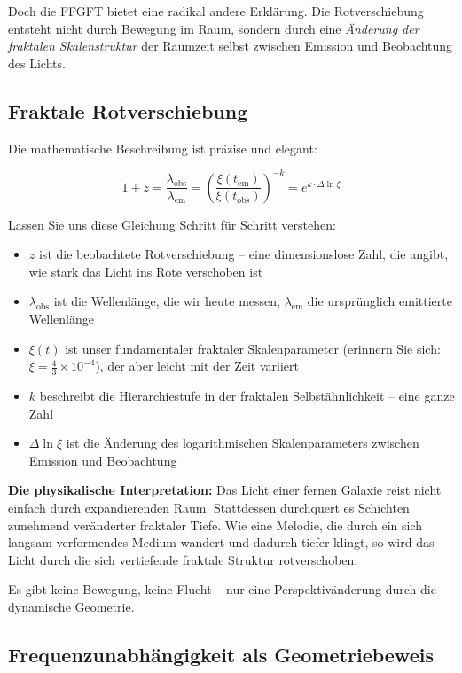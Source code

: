 Doch die FFGFT bietet eine radikal andere Erklärung. Die Rotverschiebung entsteht nicht durch Bewegung im Raum, sondern durch eine \textit{Änderung der fraktalen Skalenstruktur} der Raumzeit selbst zwischen Emission und Beobachtung des Lichts.

\subsection{Fraktale Rotverschiebung}

Die mathematische Beschreibung ist präzise und elegant:

\begin{equation}
1 + z = \frac{\lambda_{\text{obs}}}{\lambda_{\text{em}}} = \left(\frac{\xi(t_{\text{em}})}{\xi(t_{\text{obs}})}\right)^{-k} = e^{k \cdot \Delta \ln \xi}
\end{equation}

Lassen Sie uns diese Gleichung Schritt für Schritt verstehen:

\begin{itemize}[leftmargin=*]
\item $z$ ist die beobachtete Rotverschiebung -- eine dimensionslose Zahl, die angibt, wie stark das Licht ins Rote verschoben ist
\item $\lambda_{\text{obs}}$ ist die Wellenlänge, die wir heute messen, $\lambda_{\text{em}}$ die ursprünglich emittierte Wellenlänge
\item $\xi(t)$ ist unser fundamentaler fraktaler Skalenparameter (erinnern Sie sich: $\xi = \frac{4}{3} \times 10^{-4}$), der aber leicht mit der Zeit variiert
\item $k$ beschreibt die Hierarchiestufe in der fraktalen Selbstähnlichkeit -- eine ganze Zahl
\item $\Delta \ln \xi$ ist die Änderung des logarithmischen Skalenparameters zwischen Emission und Beobachtung
\end{itemize}

\textbf{Die physikalische Interpretation:} Das Licht einer fernen Galaxie reist nicht einfach durch expandierenden Raum. Stattdessen durchquert es Schichten zunehmend veränderter fraktaler Tiefe. Wie eine Melodie, die durch ein sich langsam verformendes Medium wandert und dadurch tiefer klingt, so wird das Licht durch die sich vertiefende fraktale Struktur rotverschoben.

Es gibt keine Bewegung, keine Flucht -- nur eine Perspektivänderung durch die dynamische Geometrie.

\subsection{Frequenzunabhängigkeit als Geometriebeweis}

